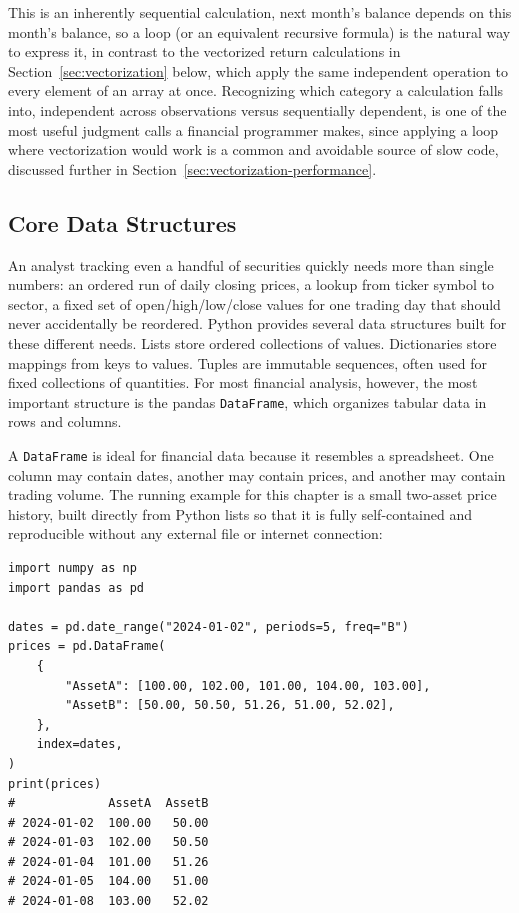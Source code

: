 \documentclass[../ai_in_finance]{subfiles}
\begin{document}
This is an inherently sequential calculation, next month's balance depends on this month's balance, so a loop (or an equivalent recursive formula) is the natural way to express it, in contrast to the vectorized return calculations in Section~\ref{sec:vectorization} below, which apply the same independent operation to every element of an array at once.
Recognizing which category a calculation falls into, independent across observations versus sequentially dependent, is one of the most useful judgment calls a financial programmer makes, since applying a loop where vectorization would work is a common and avoidable source of slow code, discussed further in Section~\ref{sec:vectorization-performance}.

\subsection{Core Data Structures}

An analyst tracking even a handful of securities quickly needs more than single numbers: an ordered run of daily closing prices, a lookup from ticker symbol to sector, a fixed set of open/high/low/close values for one trading day that should never accidentally be reordered. Python provides several data structures built for these different needs. Lists store ordered collections of values. Dictionaries store mappings from keys to values. Tuples are immutable sequences, often used for fixed collections of quantities. For most financial analysis, however, the most important structure is the pandas \texttt{DataFrame}, which organizes tabular data in rows and columns.

A \texttt{DataFrame} is ideal for financial data because it resembles a spreadsheet. One column may contain dates, another may contain prices, and another may contain trading volume. The running example for this chapter is a small two-asset price history, built directly from Python lists so that it is fully self-contained and reproducible without any external file or internet connection:

\begin{verbatim}
import numpy as np
import pandas as pd

dates = pd.date_range("2024-01-02", periods=5, freq="B")
prices = pd.DataFrame(
    {
        "AssetA": [100.00, 102.00, 101.00, 104.00, 103.00],
        "AssetB": [50.00, 50.50, 51.26, 51.00, 52.02],
    },
    index=dates,
)
print(prices)
#             AssetA  AssetB
# 2024-01-02  100.00   50.00
# 2024-01-03  102.00   50.50
# 2024-01-04  101.00   51.26
# 2024-01-05  104.00   51.00
# 2024-01-08  103.00   52.02
\end{verbatim}
\end{document}
